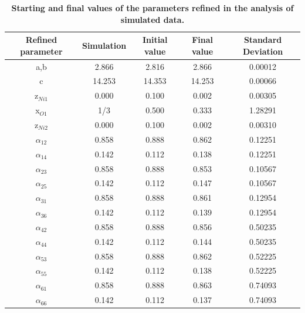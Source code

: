 \begin{table}
\begin{center}
\begin{tabular}{|c|c|c|c|c|}
\hline
Refined parameter & Simulation & Initial value & Final value & Standard Deviation \\

\hline
a,b & 2.866 & 2.816 & 2.866 & 0.00012\\
\hline
c & 14.253 & 14.353 & 14.253 & 0.00066\\
\hline
z$_{Ni1}$ & 0.000 & 0.100 & 0.002 & 0.00305\\
\hline
x$_{O1}$ & 1/3 & 0.500 & 0.333 & 1.28291\\
\hline
z$_{Ni2}$ & 0.000	&0.100&	0.002 & 0.00310\\
\hline
$\alpha_{12}$ & 0.858&	0.888	&0.862 & 0.12251\\
\hline
$\alpha_{14}$ & 0.142	&0.112&	0.138 & 0.12251\\
\hline
$\alpha_{23}$ & 0.858&	0.888	&0.853 & 0.10567\\
\hline
$\alpha_{25}$ & 0.142	&0.112	&0.147 & 0.10567\\
\hline
$\alpha_{31}$ & 0.858&	0.888&	0.861 & 0.12954\\
\hline
$\alpha_{36}$ & 0.142&	0.112&	0.139 & 0.12954\\
\hline
$\alpha_{42}$ & 0.858&	0.888	&0.856 & 0.50235\\
\hline
$\alpha_{44}$ & 0.142&	0.112	&0.144 & 0.50235\\
\hline
$\alpha_{53}$ & 0.858&	0.888	&0.862 & 0.52225\\
\hline
$\alpha_{55}$ & 0.142&	0.112	&0.138 & 0.52225\\
\hline
$\alpha_{61}$ & 0.858&	0.888	&0.863 & 0.74093\\
\hline
$\alpha_{66}$ & 0.142&	0.112	&0.137 & 0.74093\\
\hline

\end{tabular}
\caption{\textbf{Starting and final values of the parameters refined in the analysis of simulated data.}}
\label{taulasim}
\end{center}
\end{table}


